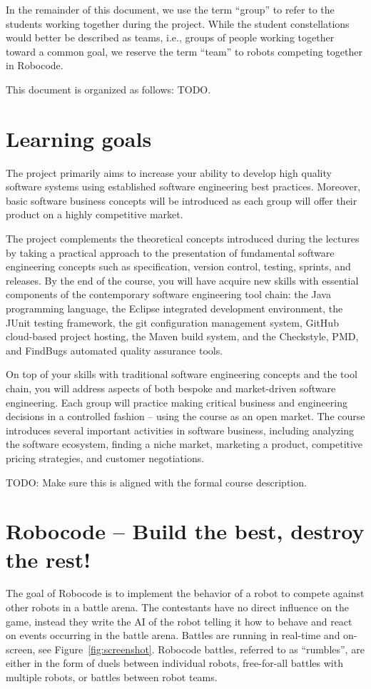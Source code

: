 \documentclass{scrreprt}
\begin{document}
In the remainder of this document, we use the term ``group'' to refer to the students working together during the project. While the student constellations would better be described as teams, i.e., groups of people working together toward a common goal, we reserve the term ``team'' to robots competing together in Robocode.

This document is organized as follows: TODO.

\section{Learning goals}
The project primarily aims to increase your ability to develop high quality software systems using established software engineering best practices. Moreover, basic software business concepts will be introduced  as each group will offer their product on a highly competitive market.

The project complements the theoretical concepts introduced during the lectures by taking a practical approach to the presentation of fundamental software engineering concepts such as specification, version control, testing, sprints, and releases. By the end of the course, you will have acquire new skills with essential components of the contemporary  software engineering tool chain: the Java programming language, the Eclipse integrated development environment, the JUnit testing framework, the git configuration management system, GitHub cloud-based project hosting, the Maven build system, and the Checkstyle, PMD, and FindBugs automated quality assurance tools.

On top of your skills with traditional software engineering concepts and the tool chain, you will address aspects of both bespoke and market-driven software engineering. Each group will practice making critical business and engineering decisions in a controlled fashion -- using the course as an open market. The course introduces several important activities in software business, including analyzing the software ecosystem, finding a niche market, marketing a product, competitive pricing strategies, and customer negotiations.

TODO: Make sure this is aligned with the formal course description.

\section{Robocode -- Build the best, destroy the rest!}
The goal of Robocode is to implement the behavior of a robot to compete against other robots in a battle arena. The contestants have no direct influence on the game, instead they write the AI of the robot telling it how to behave and react on events occurring in the battle arena. Battles are running in real-time and on-screen, see Figure~\ref{fig:screenshot}. Robocode battles, referred to as ``rumbles'', are either in the form of duels between individual robots, free-for-all battles with multiple robots, or battles between robot teams.
\end{document}
